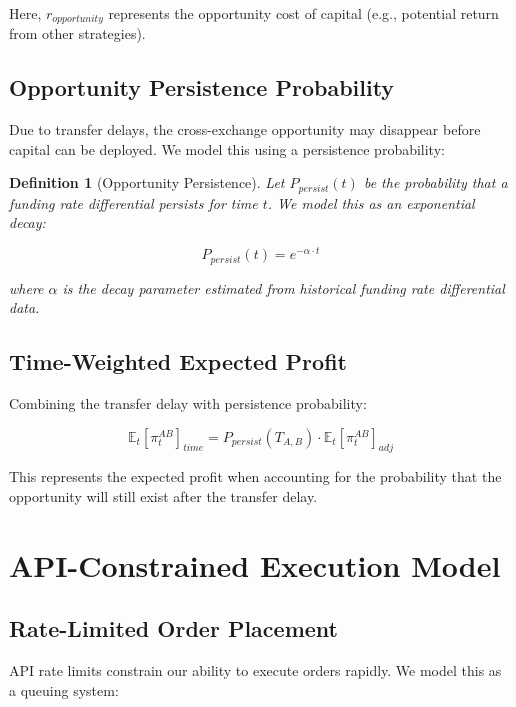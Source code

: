 \documentclass{article}
\newtheorem{definition}{Definition}
\begin{document}
Here, $r_{opportunity}$ represents the opportunity cost of capital (e.g., potential return from other strategies).

\subsection{Opportunity Persistence Probability}

Due to transfer delays, the cross-exchange opportunity may disappear before capital can be deployed. We model this using a persistence probability:

\begin{definition}[Opportunity Persistence]
Let $P_{persist}(t)$ be the probability that a funding rate differential persists for time $t$. We model this as an exponential decay:

\begin{equation}
P_{persist}(t) = e^{-\alpha \cdot t}
\end{equation}

where $\alpha$ is the decay parameter estimated from historical funding rate differential data.
\end{definition}

\subsection{Time-Weighted Expected Profit}

Combining the transfer delay with persistence probability:

\begin{equation}
\mathbb{E}_t[\pi^{AB}_t]_{time} = P_{persist}(T_{A,B}) \cdot \mathbb{E}_t[\pi^{AB}_t]_{adj}
\end{equation}

This represents the expected profit when accounting for the probability that the opportunity will still exist after the transfer delay.

\section{API-Constrained Execution Model}

\subsection{Rate-Limited Order Placement}

API rate limits constrain our ability to execute orders rapidly. We model this as a queuing system:
\end{document}
